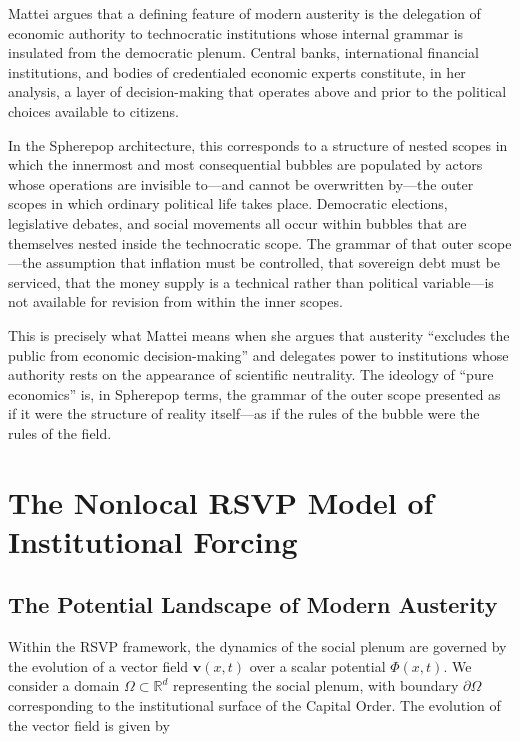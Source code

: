 \documentclass[12pt,a4paper]{article}
\begin{document}
Mattei argues that a defining feature of modern austerity is the delegation of economic authority to technocratic institutions whose internal grammar is insulated from the democratic plenum. Central banks, international financial institutions, and bodies of credentialed economic experts constitute, in her analysis, a layer of decision-making that operates above and prior to the political choices available to citizens.

In the Spherepop architecture, this corresponds to a structure of nested scopes in which the innermost and most consequential bubbles are populated by actors whose operations are invisible to---and cannot be overwritten by---the outer scopes in which ordinary political life takes place. Democratic elections, legislative debates, and social movements all occur within bubbles that are themselves nested inside the technocratic scope. The grammar of that outer scope---the assumption that inflation must be controlled, that sovereign debt must be serviced, that the money supply is a technical rather than political variable---is not available for revision from within the inner scopes.

This is precisely what Mattei means when she argues that austerity ``excludes the public from economic decision-making'' and delegates power to institutions whose authority rests on the appearance of scientific neutrality. The ideology of ``pure economics'' is, in Spherepop terms, the grammar of the outer scope presented as if it were the structure of reality itself---as if the rules of the bubble were the rules of the field.

\section{The Nonlocal RSVP Model of Institutional Forcing}

\subsection{The Potential Landscape of Modern Austerity}

Within the RSVP framework, the dynamics of the social plenum are governed by the evolution of a vector field $\mathbf{v}(x,t)$ over a scalar potential $\Phi(x,t)$. We consider a domain $\Omega \subset \mathbb{R}^d$ representing the social plenum, with boundary $\partial\Omega$ corresponding to the institutional surface of the Capital Order. The evolution of the vector field is given by
\end{document}
